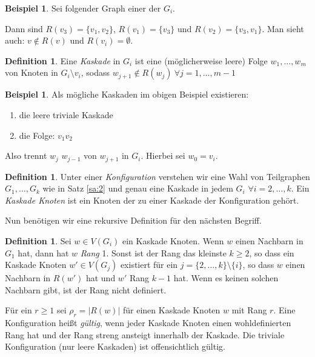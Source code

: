 \documentclass[12pt,a4paper]{scrartcl}
\numberwithin{equation}{section} %
\theoremstyle{definition}
\newtheorem{defn}[auf]{Definition}
\newtheorem{bsp}[auf]{Beispiel}
\theoremstyle{plain}
\newcommand{\abs}[1]{\left\vert #1\right\vert}
\begin{document}
\begin{bsp} Sei folgender Graph einer der $G_i$.
\begin{figure}[h]
    \centering
\end{figure}
Dann sind $R(v_3)=\lbrace v_1,v_2\rbrace$, $R(v_1)=\lbrace v_3\rbrace$ und $R(v_2)=\lbrace v_3, v_1\rbrace$. Man sieht auch: $v\not\in R(v)$ und $R(v_i)=\emptyset$.
\end{bsp}
\begin{defn}
Eine \emph{Kaskade} in $G_i$ ist eine (möglicherweise leere) Folge $w_1,\dotsc,w_m$ von Knoten in $G_i\setminus v_i$, sodass $w_{j+1}\not\in R(w_j)~\forall j=1,\dotsc,m-1$ 
\end{defn}
\begin{bsp}
Als mögliche Kaskaden im obigen Beispiel existieren: 
\begin{enumerate}
    \item die leere triviale Kaskade
    \item die Folge: $v_1 v_2$
\end{enumerate}
\end{bsp}
Also trennt $w_j$ $w_{j-1}$ von $w_{j+1}$ in $G_i$. Hierbei sei $w_0=v_i$. 
\begin{defn}
Unter einer \emph{Konfiguration} verstehen wir eine Wahl von Teilgraphen $G_1,\dotsc,G_k$ wie in Satz \ref{sa:2} und genau eine Kaskade in jedem $G_i$ $\forall i=2,\dotsc,k$. Ein \emph{Kaskade Knoten} ist ein Knoten der zu einer Kaskade der Konfiguration gehört.
\end{defn}
Nun benötigen wir eine rekursive Definition für den nächsten Begriff.
\begin{defn}
Sei $w\in V(G_i)$ ein Kaskade Knoten. Wenn $w$ einen Nachbarn in $G_1$ hat, dann hat $w$ \emph{Rang} 1. Sonst ist der Rang das kleinste $k\ge 2$, so dass ein Kaskade Knoten $w'\in V(G_j)$ existiert für ein $j=\lbrace 2,\dotsc,k\rbrace\setminus \lbrace i\rbrace$, so dass $w$ einen Nachbarn in $R(w')$ hat und $w'$ Rang $k-1$ hat. Wenn es keinen solchen Nachbarn gibt, ist der Rang nicht definiert. \par
Für ein $r\ge 1$ sei $\rho_r=\abs{R(w)}$ für einen Kaskade Knoten $w$ mit Rang $r$. Eine Konfiguration heißt \emph{gültig}, wenn jeder Kaskade Knoten einen wohldefinierten Rang hat und der Rang streng ansteigt innerhalb der Kaskade. Die triviale Konfiguration (nur leere Kaskaden) ist offensichtlich gültig.
\end{defn}
\end{document}
